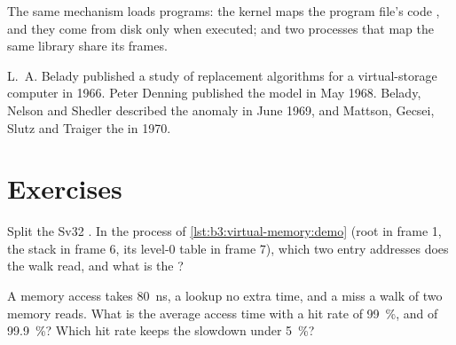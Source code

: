 \label{lst:b3:virtual-memory:mmap}

\label{out:b3:virtual-memory:mmap}

The same mechanism loads programs: the kernel maps the program file's code , and they come from disk only when executed; and two processes that map the same library share its frames.

\begin{history}[Paging]
L.~A. Belady published a study of replacement algorithms for a virtual-storage computer in 1966. %
Peter Denning published the  model in May 1968. %
Belady, Nelson and Shedler described the anomaly in June 1969, %
and Mattson, Gecsei, Slutz and Traiger the  in 1970. %
\end{history}

\section{Exercises}\label{sec:b3:virtual-memory:exercises}

\begin{exercise}[$\star$]\label{exo:b3:virtual-memory:1}
Split the Sv32  . In the process of \cref{lst:b3:virtual-memory:demo} (root in frame 1, the stack  in frame 6, its level-0 table in frame 7), which two entry addresses does the walk read, and what is the ?
\end{exercise}

\begin{exercise}[$\star$]\label{exo:b3:virtual-memory:2}
A memory access takes 80~ns, a  lookup no extra time, and a  miss a walk of two memory reads. What is the average access time with a hit rate of 99~\%, and of 99.9~\%? Which hit rate keeps the slowdown under 5~\%?
\end{exercise}

